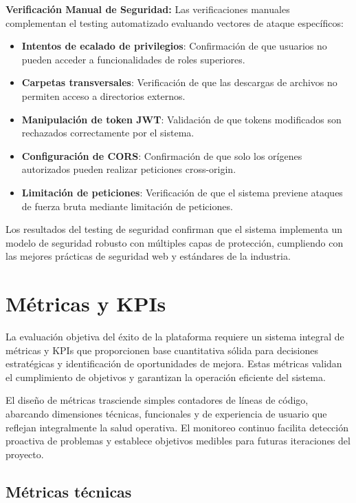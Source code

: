 \documentclass[12pt,a4paper,oneside]{report}
\begin{document}
\textbf{Verificación Manual de Seguridad:} Las verificaciones manuales complementan el testing automatizado evaluando vectores de ataque específicos:
\begin{itemize}
\item \textbf{Intentos de ecalado de privilegios}: Confirmación de que usuarios no pueden acceder a funcionalidades de roles superiores.
\item \textbf{Carpetas transversales}: Verificación de que las descargas de archivos no permiten acceso a directorios externos.
\item \textbf{Manipulación de token JWT}: Validación de que tokens modificados son rechazados correctamente por el sistema.
\item \textbf{Configuración de CORS}: Confirmación de que solo los orígenes autorizados pueden realizar peticiones cross-origin.
\item \textbf{Limitación de peticiones}: Verificación de que el sistema previene ataques de fuerza bruta mediante limitación de peticiones.
\end{itemize}

Los resultados del testing de seguridad confirman que el sistema implementa un modelo de seguridad robusto con múltiples capas de protección, cumpliendo con las mejores prácticas de seguridad web y estándares de la industria.

\section{Métricas y KPIs}\label{muxe9tricas-y-kpis}

La evaluación objetiva del éxito de la plataforma requiere un sistema integral de métricas y KPIs que proporcionen base cuantitativa sólida para decisiones estratégicas y identificación de oportunidades de mejora. Estas métricas validan el cumplimiento de objetivos y garantizan la operación eficiente del sistema.

El diseño de métricas trasciende simples contadores de líneas de código, abarcando dimensiones técnicas, funcionales y de experiencia de usuario que reflejan integralmente la salud operativa. El monitoreo continuo facilita detección proactiva de problemas y establece objetivos medibles para futuras iteraciones del proyecto.

\subsection{Métricas técnicas}\label{muxe9tricas-tuxe9cnicas}
\end{document}

